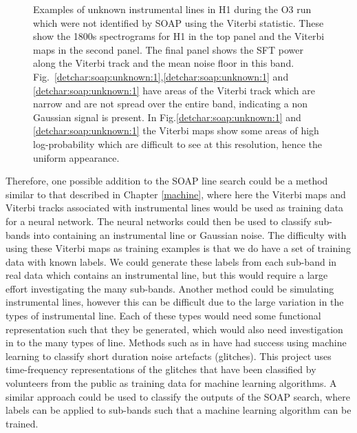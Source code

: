 \begin{figure}[hpt]
	\caption[lines from unknown sources]{Examples of unknown instrumental lines in H1 during the O3 run which were not identified by SOAP using the Viterbi statistic. These show the 1800s spectrograms for H1 in the top panel and the Viterbi maps in the second panel. The final panel shows the \gls{SFT} power along the Viterbi track and the mean noise floor in this band.  Fig.~\ref{detchar:soap:unknown:1},\ref{detchar:soap:unknown:1} and \ref{detchar:soap:unknown:1} have areas of the Viterbi track which are narrow and are not spread over the entire band, indicating a non Gaussian signal is present. In Fig.\ref{detchar:soap:unknown:1} and \ref{detchar:soap:unknown:1} the Viterbi maps show some areas of high log-probability which are difficult to see at this resolution, hence the uniform appearance. }
	\label{detchar:soap:unknown}
\end{figure}
%

Therefore, one possible addition to the SOAP line search could be a method similar to that described in Chapter \ref{machine}, where here the Viterbi maps and Viterbi tracks associated with instrumental lines would be used as training data for a neural network. 
The neural networks could then be used to classify sub-bands into containing an instrumental line or Gaussian noise.
The difficulty with using these Viterbi maps as training examples is that we do have a set of training data with known labels. 
We could generate these labels from each sub-band in real data which contains an instrumental line, but this would require a large effort investigating the many sub-bands. Another method could be simulating instrumental lines, however this can be difficult due to the large variation in the types of instrumental line. Each of these types would need some functional representation such that they be generated, which would also need investigation in to the many types of line.
Methods such as in \citep{zevin2017GravitySpy} have had success using machine learning to classify short duration noise artefacts (glitches). This project uses time-frequency representations of the glitches that have been classified by volunteers from the public as training data for machine learning algorithms.
A similar approach could be used to classify the outputs of the SOAP search, where labels can be applied to sub-bands such that a machine learning algorithm can be trained.

